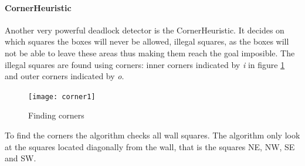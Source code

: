 \paragraph{CornerHeuristic}Another very powerful deadlock detector is the CornerHeuristic. It decides on which squares the boxes will never be allowed, illegal squares, as the boxes will not be able to leave these areas thus making them reach the goal imposible. The illegal squares are found using corners: inner corners indicated by \textit{i} in figure \ref{fig:cornerheuristic} and outer corners indicated by \textit{o}.
\begin{figure}[htp]
	\centering
	\texttt{[image: corner1]}
	\caption{Finding corners}
	\label{fig:cornerheuristic}
\end{figure}
To find the corners the algorithm checks all wall squares. The algorithm only look at the squares located diagonally from the wall, that is the squares NE, NW, SE and SW.
